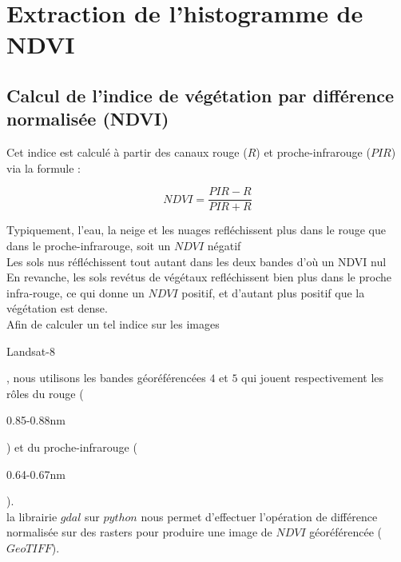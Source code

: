 \documentclass{book}
\begin{document}
\chapter{Extraction de l'histogramme de NDVI}

\section{Calcul de l'indice de végétation par différence normalisée (NDVI)}

Cet indice est calculé à partir des canaux
rouge ($R$) et proche-infrarouge ($PIR$) via la formule : 

\[NDVI=\frac{PIR-R}{PIR+R}\]

Typiquement, l'eau, la neige et les nuages refléchissent plus dans le rouge que dans le proche-infrarouge, soit un $NDVI$ négatif\\
Les sols nus réfléchissent tout autant dans les deux bandes d'où un NDVI nul\\
En revanche, les sols revétus de végétaux refléchissent bien plus dans le proche infra-rouge, ce qui donne un $NDVI$ positif, et d'autant
plus positif que la végétation est dense.\\
Afin de calculer un tel indice sur les images \begin{itshape}Landsat-8\end{itshape}, nous utilisons les bandes géoréférencées $4$ et $5$ 
qui jouent respectivement les r\^oles du rouge (\begin{itshape}0.85-0.88nm\end{itshape}) et du proche-infrarouge (\begin{itshape}0.64-0.67nm\end{itshape}).\\
la librairie $gdal$ sur $python$ nous permet d'effectuer l'opération de différence normalisée sur des rasters pour produire une image de $NDVI$ géoréférencée ($GeoTIFF$).
\end{document}
